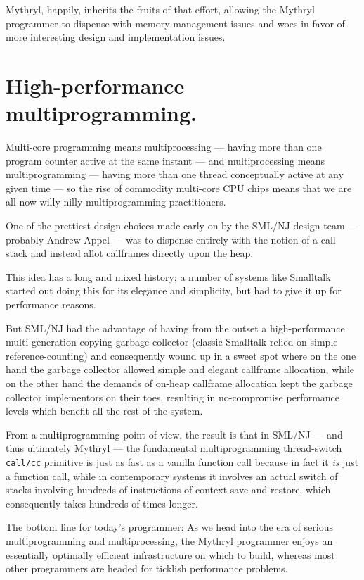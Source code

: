 Mythryl, happily, inherits the fruits of that effort, allowing the Mythryl 
programmer to dispense with memory management issues and woes in favor of 
more interesting design and implementation issues.

\section{High-performance multiprogramming.}

Multi-core programming means multiprocessing --- having more than 
one program counter active at the same instant --- and multiprocessing 
means multiprogramming --- having more than one thread conceptually 
active at any given time --- so the rise of commodity multi-core 
{\sc CPU} chips means that we are all now willy-nilly multiprogramming 
practitioners.

One of the prettiest design choices made early on by the {\sc SML/NJ} 
design team --- probably Andrew Appel --- was to dispense entirely with 
the notion of a call stack and instead allot callframes directly 
upon the heap.

This idea has a long and mixed history;  a number of systems like 
Smalltalk started out doing this for its elegance and simplicity, 
but had to give it up for performance reasons.

But {\sc SML/NJ} had the advantage of having from the outset a high-performance 
multi-generation copying garbage collector (classic Smalltalk relied 
on simple reference-counting) and consequently wound up in a sweet 
spot where on the one hand the garbage collector allowed simple and 
elegant callframe allocation, while on the other hand the demands of 
on-heap callframe allocation kept the garbage collector implementors 
on their toes, resulting in no-compromise performance levels which 
benefit all the rest of the system.

From a multiprogramming point of view, the result is that in 
{\sc SML/NJ} --- and thus ultimately Mythryl --- the fundamental 
multiprogramming thread-switch {\tt call/cc} primitive is just as 
fast as a vanilla function call because in fact it {\em is} 
just a function call, while in contemporary systems it involves an 
actual switch of stacks involving hundreds of instructions of 
context save and restore, which consequently takes hundreds of 
times longer.

The bottom line for today's programmer:  As we head into the 
era of serious multiprogramming and multiprocessing, the 
Mythryl programmer enjoys an essentially optimally efficient 
infrastructure on which to build, whereas most other programmers 
are headed for ticklish performance problems.


